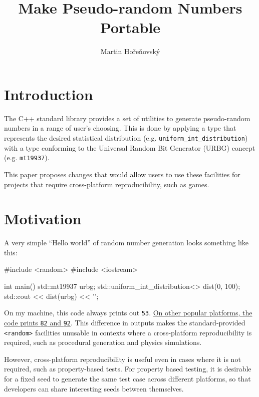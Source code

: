 \documentclass{wg21}
\title{Make Pseudo-random Numbers Portable}
\author{Martin Hořeňovský}{martin.horenovsky@gmail.com}
\begin{document}
\maketitle



\hypertarget{introduction}{%
    \section{Introduction}\label{introduction}}

The C++ standard library provides a set of utilities to generate
pseudo-random numbers in a range of user's choosing. This is done
by applying a type that represents the desired statistical distribution
(e.g. \texttt{uniform\_int\_distribution}) with a type conforming
to the Universal Random Bit Generator (URBG) concept (e.g. \texttt{mt19937}).

This paper proposes changes that would allow users to use these facilities
for projects that require cross-platform reproducibility, such as games.


\hypertarget{motivation}{%
    \section{Motivation}\label{motivation}}

A very simple ``Hello world'' of random number generation looks something
like this:

\begin{codeblock}
#include <random>
#include <iostream>

int main() {
    std::mt19937 urbg;
    std::uniform_int_distribution<> dist(0, 100);
    std::cout << dist(urbg) << '\n';
}
\end{codeblock}

On my machine, this code always prints out \texttt{53}. \href{https://godbolt.org/z/dB7H_2}{On other
popular platforms, the code prints \texttt{82} and \texttt{92}}. This
difference in outputs makes the standard-provided \texttt{<random>}
facilities unusable in contexts where a cross-platform reproducibility
is required, such as procedural generation and physics simulations.

However, cross-platform reproducibility is useful even in cases
where it is not required, such as property-based tests. For property
based testing, it is desirable for a fixed seed to generate the same
test case across different platforms, so that developers can share
interesting seeds between themselves.
\end{document}

